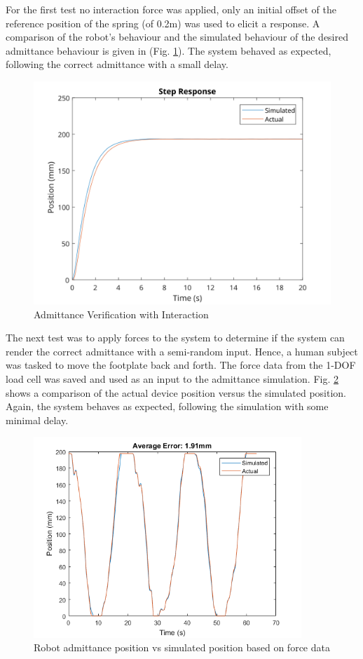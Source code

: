 \documentclass[12pt]{report}
\begin{document}
For the first test no interaction force was applied, only an initial offset of the reference position of the spring (of 0.2m) was used to elicit a response. A comparison of the robot's behaviour and the simulated behaviour of the desired admittance behaviour is given in (Fig. \ref{fig:nVerNoInt}). The system behaved as expected, following the correct admittance with a small delay.

\begin{figure}[t] 
	\centering
	\includegraphics[width=0.9\linewidth]{Mar12_NoForce_Step_Plot}
	\caption{Admittance Verification with Interaction}
	\label{fig:nVerNoInt}
\end{figure}

The next test was to apply forces to the system to determine if the system can render the correct admittance with a semi-random input. Hence, a human subject was tasked to move the footplate back and forth. The force data from the 1-DOF load cell was saved and used as an input to the admittance simulation. Fig. \ref{fig:adm_sim} shows a comparison of the actual device position versus the simulated position. Again, the system behaves as expected, following the simulation with some minimal delay.

\begin{figure}[h]
	\centering
	\includegraphics[width=0.9\textwidth]{admittance_sim}
	\caption{Robot admittance position vs simulated position based on force data}
	\label{fig:adm_sim}
\end{figure}	
\end{document}
